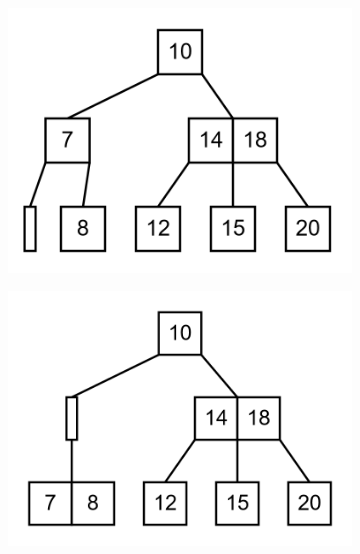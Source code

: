 \documentclass[11pt,a4paper]{article}
\begin{document}
\begin{loesung}
\begin{enumerate}
\begin{figure}[h!]
\begin{subfigure}[b]{0.31\textwidth}
                \includegraphics[scale=0.15]{img/3e/7}
            \end{subfigure}
            \begin{subfigure}[b]{0.31\textwidth}
                \centering
                \includegraphics[scale=0.15]{img/3e/8}
            \end{subfigure}
            \begin{subfigure}[b]{0.31\textwidth}
                \centering

\end{subfigure}
\end{figure}
\end{enumerate}
\end{loesung}
\end{document}
